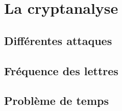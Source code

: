 \chapter{La cryptanalyse}
\section{Différentes attaques}
\section{Fréquence des lettres}
\section{Problème de temps}

